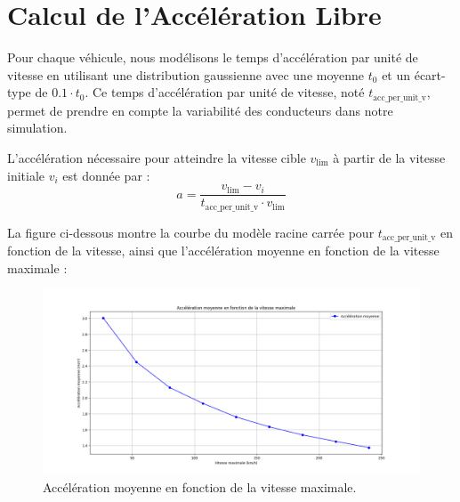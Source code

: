 \documentclass{article}
\begin{document}
\section{Calcul de l'Accélération Libre}
Pour chaque véhicule, nous modélisons le temps d'accélération par unité de vitesse en utilisant une distribution gaussienne avec une moyenne \(t_0\) et un écart-type de \(0.1 \cdot t_0\). Ce temps d'accélération par unité de vitesse, noté \(t_{\text{acc\_per\_unit\_v}}\), permet de prendre en compte la variabilité des conducteurs dans notre simulation.

L'accélération nécessaire pour atteindre la vitesse cible \(v_{\text{lim}}\) à partir de la vitesse initiale \(v_i\) est donnée par :
\[
a = \frac{v_{\text{lim}} - v_i}{t_{\text{acc\_per\_unit\_v}} \cdot v_{\text{lim}}} \tag{3}
\]


La figure ci-dessous montre la courbe du modèle racine carrée pour \(t_{\text{acc\_per\_unit\_v}}\) en fonction de la vitesse, ainsi que l'accélération moyenne en fonction de la vitesse maximale :

\begin{figure}[h!]
    \centering
    \includegraphics[width=\textwidth]{Free acceleration.png}
    \caption{Accélération moyenne en fonction de la vitesse maximale.}
    \label{fig:free_acceleration}
\end{figure}
\end{document}
